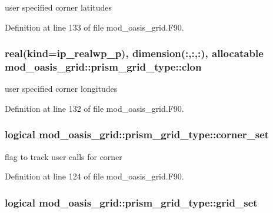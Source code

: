 user specified corner latitudes 



Definition at line 133 of file mod\+\_\+oasis\+\_\+grid.\+F90.

\hypertarget{structmod__oasis__grid_1_1prism__grid__type_a7aac140b1875e0ecae3a816c0cd6d45e}{
\subsubsection[{clon}]{\setlength{\rightskip}{0pt plus 5cm}real(kind=ip\+\_\+realwp\+\_\+p), dimension(\+:,\+:,\+:), allocatable mod\+\_\+oasis\+\_\+grid\+::prism\+\_\+grid\+\_\+type\+::clon\hspace{0.3cm}{\ttfamily [private]}}}\label{structmod__oasis__grid_1_1prism__grid__type_a7aac140b1875e0ecae3a816c0cd6d45e}


user specified corner longitudes 



Definition at line 132 of file mod\+\_\+oasis\+\_\+grid.\+F90.

\hypertarget{structmod__oasis__grid_1_1prism__grid__type_a852b381de47913b96e3fa28ade472579}{
\subsubsection[{corner\+\_\+set}]{\setlength{\rightskip}{0pt plus 5cm}logical mod\+\_\+oasis\+\_\+grid\+::prism\+\_\+grid\+\_\+type\+::corner\+\_\+set\hspace{0.3cm}{\ttfamily [private]}}}\label{structmod__oasis__grid_1_1prism__grid__type_a852b381de47913b96e3fa28ade472579}


flag to track user calls for corner 



Definition at line 124 of file mod\+\_\+oasis\+\_\+grid.\+F90.

\hypertarget{structmod__oasis__grid_1_1prism__grid__type_a41b62a294b04765a04f6f0d70c261df7}{
\subsubsection[{grid\+\_\+set}]{\setlength{\rightskip}{0pt plus 5cm}logical mod\+\_\+oasis\+\_\+grid\+::prism\+\_\+grid\+\_\+type\+::grid\+\_\+set\hspace{0.3cm}{\ttfamily [private]}}}\label{structmod__oasis__grid_1_1prism__grid__type_a41b62a294b04765a04f6f0d70c261df7}


